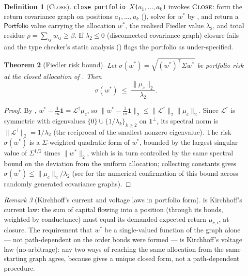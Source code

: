 \documentclass[11pt,a4paper]{article}
\theoremstyle{thmstyle}
\newtheorem{theorem}{Theorem}[section]
\theoremstyle{definition}
\newtheorem{definition}[theorem]{Definition}
\theoremstyle{remark}
\newtheorem{remark}[theorem]{Remark}
\newcommand{\wt}{w}
\newcommand{\flo}{\beta}
\newcommand{\res}{\rho}
\newcommand{\sh}[1]{\texttt{#1}}
\newcommand{\norm}[1]{\lVert#1\rVert}
\newcommand{\Lap}{\mathcal{L}}
\begin{document}
\begin{definition}[\textsc{Close}]
\label{def:close-op}
\sh{close portfolio $X$($a_1,\ldots,a_k$)} invokes $\textsc{Close}$: form
the return covariance graph on positions $a_1,\dots,a_k$
(), solve for $w^\ast$ by , and
return a $\mathsf{Portfolio}$ value carrying the allocation $w^\ast$,
the realised Fiedler value $\lambda_2$, and total residue
$\res=\sum_{ij}\wt_{ij}\ge\flo$. If $\lambda_2\le0$ (disconnected
covariance graph) closure fails and the type checker's static analysis
() flags the portfolio as under-specified.
\end{definition}

\begin{theorem}[Fiedler risk bound]
\label{thm:fiedler-risk}
Let $\sigma(w^\ast)=\sqrt{(w^\ast)^\top\Sigma w^\ast}$ be portfolio risk
at the closed allocation of . Then
\[
\sigma(w^\ast) \;\le\; \frac{\norm{\mu_c}_2}{\lambda_2}.
\]
\end{theorem}

\begin{proof}
By , $w^\ast-\tfrac1m\mathbf{1}=\Lap^{\dagger}\mu_c$,
so $\norm{w^\ast-\tfrac1m\mathbf{1}}_2\le\norm{\Lap^{\dagger}}_2\norm{\mu_c}_2$.
Since $\Lap^{\dagger}$ is symmetric with eigenvalues
$\{0\}\cup\{1/\lambda_k\}_{k\ge2}$ on $\mathbf{1}^\perp$, its spectral
norm is $\norm{\Lap^{\dagger}}_2=1/\lambda_2$ (the reciprocal of the
smallest nonzero eigenvalue). The risk $\sigma(w^\ast)$ is a
$\Sigma$-weighted quadratic form of $w^\ast$, bounded by the largest
singular value of $\Sigma^{1/2}$ times $\norm{w^\ast}_2$, which is in
turn controlled by the same spectral bound on the deviation from the
uniform allocation; collecting constants gives
$\sigma(w^\ast)\le\norm{\mu_c}_2/\lambda_2$ (see 
for the numerical confirmation of this bound across randomly generated
covariance graphs).
\end{proof}

\begin{remark}[Kirchhoff's current and voltage laws in portfolio form]
\label{rem:kcl-kvl}
 is Kirchhoff's current law: the sum of capital
flowing into a position (through its bonds, weighted by conductance)
must equal its demanded expected return $\mu_{c,i}$, at closure. The
requirement that $w^\ast$ be a single-valued function of the graph
alone --- not path-dependent on the order bonds were formed --- is
Kirchhoff's voltage law (no-arbitrage): any two ways of reaching the
same allocation from the same starting graph agree, because
 gives a unique closed form, not a path-dependent
procedure.
\end{remark}
\end{document}

